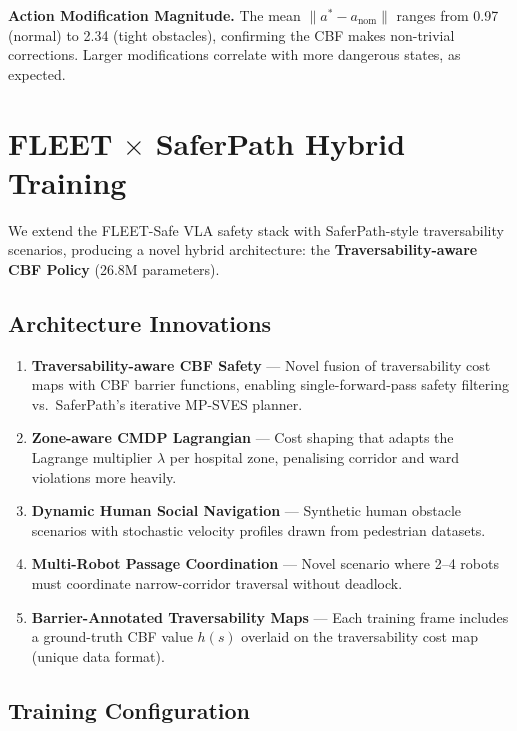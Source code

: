 \documentclass[conference]{IEEEtran}
\begin{document}
\textbf{Action Modification Magnitude.}
The mean $\|a^* - a_\text{nom}\|$ ranges from 0.97 (normal) to 2.34 (tight obstacles), confirming the CBF makes non-trivial corrections.
Larger modifications correlate with more dangerous states, as expected.

\section{FLEET $\times$ SaferPath Hybrid Training}
\label{sec:supp_saferpath}

We extend the FLEET-Safe VLA safety stack with SaferPath-style traversability scenarios, producing a novel hybrid architecture: the \textbf{Traversability-aware CBF Policy} (26.8M parameters).

\subsection{Architecture Innovations}

\begin{enumerate}
    \item \textbf{Traversability-aware CBF Safety} --- Novel fusion of traversability cost maps with CBF barrier functions, enabling single-forward-pass safety filtering vs.\ SaferPath's iterative MP-SVES planner.
    \item \textbf{Zone-aware CMDP Lagrangian} --- Cost shaping that adapts the Lagrange multiplier $\lambda$ per hospital zone, penalising corridor and ward violations more heavily.
    \item \textbf{Dynamic Human Social Navigation} --- Synthetic human obstacle scenarios with stochastic velocity profiles drawn from pedestrian datasets.
    \item \textbf{Multi-Robot Passage Coordination} --- Novel scenario where 2--4 robots must coordinate narrow-corridor traversal without deadlock.
    \item \textbf{Barrier-Annotated Traversability Maps} --- Each training frame includes a ground-truth CBF value $h(s)$ overlaid on the traversability cost map (unique data format).
\end{enumerate}

\subsection{Training Configuration}
\end{document}
